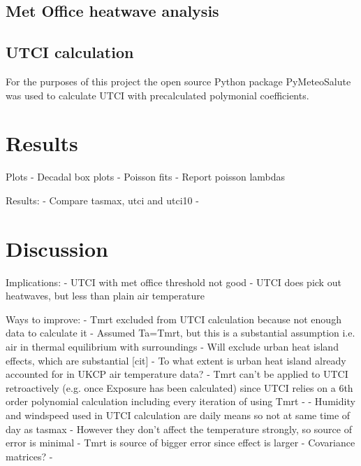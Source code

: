 \documentclass[10pt,letterpaper]{article}
\begin{document}
\subsection*{Met Office heatwave analysis}


\subsection*{UTCI calculation}
For the purposes of this project the open source Python package PyMeteoSalute was used to calculate UTCI with precalculated polymonial coefficients.\cite{pymeteosalute}









\section*{Results}



Plots
- Decadal box plots
- Poisson fits
- Report poisson lambdas

Results:
- Compare tasmax, utci and utci10
- 

\section*{Discussion}

Implications:
- UTCI with met office threshold not good
- UTCI does pick out heatwaves, but less than plain air temperature

Ways to improve:
- Tmrt excluded from UTCI calculation because not enough data to calculate it
    - Assumed Ta=Tmrt, but this is a substantial assumption i.e. air in thermal equilibrium with surroundings
    - Will exclude urban heat island effects, which are substantial [cit]
    - To what extent is urban heat island already accounted for in UKCP air temperature data?
    - Tmrt can't be applied to UTCI retroactively (e.g. once Exposure has been calculated) since UTCI relies on a 6th order polynomial calculation including every iteration of using Tmrt
    - \cite{Weihs2018}
- Humidity and windspeed used in UTCI calculation are daily means so not at same time of day as tasmax
    - However they don't affect the temperature strongly, so source of error is minimal
    - Tmrt is source of bigger error since effect is larger
    - Covariance matrices?
- 
\end{document}
